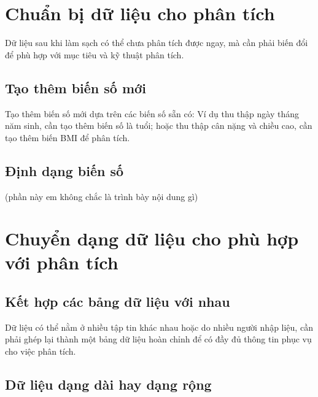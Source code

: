 \documentclass[]{tufte-book}
\begin{document}
\hypertarget{chun-bi-d-liu-cho-phan-tich}{%
\chapter{Chuẩn bị dữ liệu cho phân tích}\label{chun-bi-d-liu-cho-phan-tich}}

Dữ liệu sau khi làm sạch có thể chưa phân tích được ngay, mà cần phải biến đổi để phù hợp với mục tiêu và kỹ thuật phân tích.

\hypertarget{tao-them-bin-s-mi}{%
\section{Tạo thêm biến số mới}\label{tao-them-bin-s-mi}}

Tạo thêm biến số mới dựa trên các biến số sẵn có: Ví dụ thu thập ngày tháng năm sinh, cần tạo thêm biến số là tuổi; hoặc thu thập cân nặng và chiều cao, cần tạo thêm biến BMI để phân tích.

\hypertarget{inh-dang-bin-s}{%
\section{Định dạng biến số}\label{inh-dang-bin-s}}

(phần này em không chắc là trình bày nội dung gì)

\hypertarget{chuyn-dang-d-liu-cho-phu-hp-vi-phan-tich}{%
\chapter{Chuyển dạng dữ liệu cho phù hợp với phân tích}\label{chuyn-dang-d-liu-cho-phu-hp-vi-phan-tich}}

\hypertarget{kt-hp-cac-bang-d-liu-vi-nhau}{%
\section{Kết hợp các bảng dữ liệu với nhau}\label{kt-hp-cac-bang-d-liu-vi-nhau}}

Dữ liệu có thể nằm ở nhiều tập tin khác nhau hoặc do nhiều người nhập liệu, cần phải ghép lại thành một bảng dữ liệu hoàn chỉnh để có đầy đủ thông tin phục vụ cho việc phân tích.

\hypertarget{d-liu-dang-dai-hay-dang-rng}{%
\section{Dữ liệu dạng dài hay dạng rộng}\label{d-liu-dang-dai-hay-dang-rng}}
\end{document}
